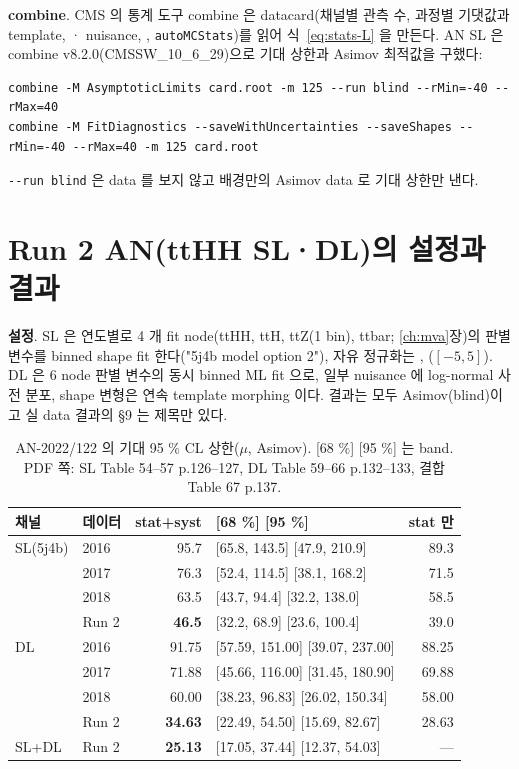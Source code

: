 \textbf{combine}. CMS 의 통계 도구 combine 은 datacard(채널별 관측 수, 과정별 기댓값과 template, · nuisance, ,
\texttt{autoMCStats})를 읽어 식~\eqref{eq:stats-L} 을 만든다. AN SL 은 combine v8.2.0(CMSSW\_10\_6\_29)으로 기대 상한과 Asimov 최적값을 구했다:
{\small
\begin{verbatim}
combine -M AsymptoticLimits card.root -m 125 --run blind --rMin=-40 --rMax=40
combine -M FitDiagnostics --saveWithUncertainties --saveShapes --rMin=-40 --rMax=40 -m 125 card.root
\end{verbatim}
}
\texttt{-{}-run blind} 은 data 를 보지 않고 배경만의 Asimov data 로 기대 상한만 낸다.

\section{Run 2 AN(ttHH SL·DL)의 설정과 결과}\label{sec:stats-an}

\textbf{설정}. SL 은 연도별로 4 개 fit node(ttHH, ttH, ttZ(1 bin), ttbar; \ref{ch:mva}장)의 판별 변수를 binned shape fit 한다("5j4b model option 2"),
자유 정규화는 , ($[-5,5]$). DL 은 6 node 판별 변수의 동시 binned ML fit 으로, 일부 nuisance 에
log-normal 사전 분포, shape 변형은 연속 template morphing 이다. 결과는 모두 Asimov(blind)이고 실 data 결과의 §9 는
제목만 있다.

\begin{table}[htbp]
\centering
\caption{AN-2022/122 의 기대 95 \% CL 상한($\mu$, Asimov). [68 \%] [95 \%] 는 band. PDF 쪽: SL Table 54--57 p.126--127, DL Table 59--66 p.132--133, 결합 Table 67 p.137.}
\label{tab:stats-an}
\small
\begin{tabular}{@{}llrl r@{}}
\toprule
채널 & 데이터 & stat+syst & [68 \%] [95 \%] & stat 만 \\
\midrule
SL(5j4b) & 2016 & 95.7 & [65.8, 143.5] [47.9, 210.9] & 89.3 \\
 & 2017 & 76.3 & [52.4, 114.5] [38.1, 168.2] & 71.5 \\
 & 2018 & 63.5 & [43.7, 94.4] [32.2, 138.0] & 58.5 \\
 & Run 2 & \textbf{46.5} & [32.2, 68.9] [23.6, 100.4] & 39.0 \\
\midrule
DL & 2016 & 91.75 & [57.59, 151.00] [39.07, 237.00] & 88.25 \\
 & 2017 & 71.88 & [45.66, 116.00] [31.45, 180.90] & 69.88 \\
 & 2018 & 60.00 & [38.23, 96.83] [26.02, 150.34] & 58.00 \\
 & Run 2 & \textbf{34.63} & [22.49, 54.50] [15.69, 82.67] & 28.63 \\
\midrule
SL+DL & Run 2 & \textbf{25.13} & [17.05, 37.44] [12.37, 54.03] & — \\
\bottomrule
\end{tabular}
\end{table}


